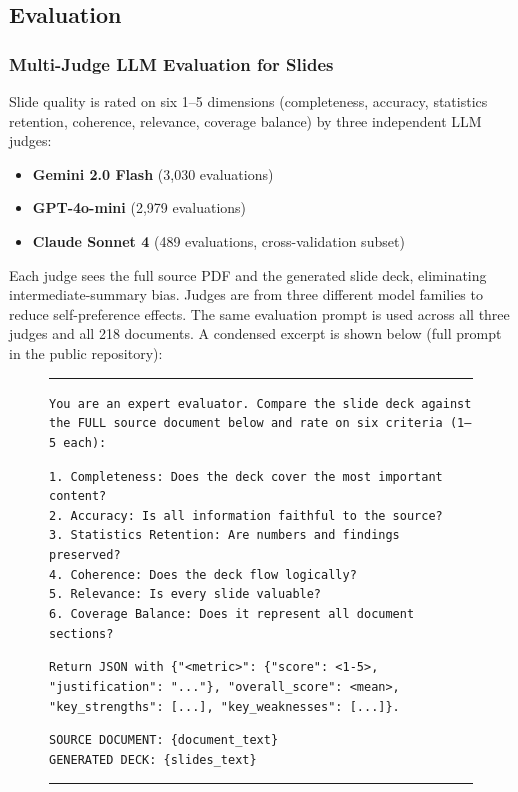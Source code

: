 \documentclass[journal]{IEEEtran}
\begin{document}
\subsection{Evaluation}

\subsubsection{Multi-Judge LLM Evaluation for Slides}
Slide quality is rated on six 1--5 dimensions (completeness, accuracy, statistics retention, coherence, relevance, coverage balance) by three independent LLM judges:
\begin{itemize}
    \item \textbf{Gemini 2.0 Flash} (3{,}030 evaluations)
    \item \textbf{GPT-4o-mini} (2{,}979 evaluations)
    \item \textbf{Claude Sonnet 4} (489 evaluations, cross-validation subset)
\end{itemize}
Each judge sees the full source PDF and the generated slide deck, eliminating intermediate-summary bias. Judges are from three different model families to reduce self-preference effects. The same evaluation prompt is used across all three judges and all 218 documents. A condensed excerpt is shown below (full prompt in the public repository):

\begin{figure}[h]
\centering
\begin{minipage}{0.95\columnwidth}
\rule{\linewidth}{0.4pt}
\footnotesize
\texttt{You are an expert evaluator. Compare the slide deck against the FULL source document below and rate on six criteria (1--5 each):}
\vspace{2pt}

\texttt{1. Completeness: Does the deck cover the most important content?}\\
\texttt{2. Accuracy: Is all information faithful to the source?}\\
\texttt{3. Statistics Retention: Are numbers and findings preserved?}\\
\texttt{4. Coherence: Does the deck flow logically?}\\
\texttt{5. Relevance: Is every slide valuable?}\\
\texttt{6. Coverage Balance: Does it represent all document sections?}
\vspace{2pt}

\texttt{Return JSON with \{"<metric>": \{"score": <1-5>, "justification": "..."\}, "overall\_score": <mean>, "key\_strengths": [...], "key\_weaknesses": [...]\}.}
\vspace{2pt}

\texttt{SOURCE DOCUMENT: \{document\_text\}}\\
\texttt{GENERATED DECK: \{slides\_text\}}
\rule{\linewidth}{0.4pt}
\end{minipage}
\end{figure}
\end{document}
